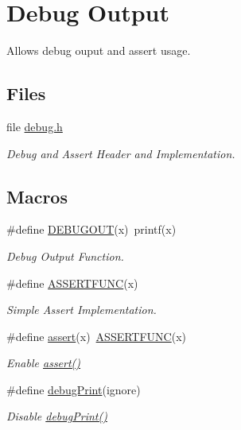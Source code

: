 \hypertarget{group__debug}{\section{Debug Output}
\label{group__debug}
}


Allows debug ouput and assert usage.  


\subsection*{Files}
\begin{DoxyCompactItemize}
\item 
file \hyperlink{debug_8h}{debug.\-h}
\begin{DoxyCompactList}\small\item\em Debug and Assert Header and Implementation. \end{DoxyCompactList}\end{DoxyCompactItemize}
\subsection*{Macros}
\begin{DoxyCompactItemize}
\item 
\#define \hyperlink{group__debug_ga19525f7b34cac5693e8cd76d113de4ea}{D\-E\-B\-U\-G\-O\-U\-T}(x)~printf(x)
\begin{DoxyCompactList}\small\item\em Debug Output Function. \end{DoxyCompactList}\item 
\#define \hyperlink{group__debug_ga9dfd1281735240dcb36d5f605013d40e}{A\-S\-S\-E\-R\-T\-F\-U\-N\-C}(x)
\begin{DoxyCompactList}\small\item\em Simple Assert Implementation. \end{DoxyCompactList}\item 
\#define \hyperlink{group__debug_gaf576bf8ffa22a44e53018c67095ffbf0}{assert}(x)~\hyperlink{group__debug_ga9dfd1281735240dcb36d5f605013d40e}{A\-S\-S\-E\-R\-T\-F\-U\-N\-C}(x)
\begin{DoxyCompactList}\small\item\em Enable \hyperlink{group__debug_gaf576bf8ffa22a44e53018c67095ffbf0}{assert()} \end{DoxyCompactList}\item 
\#define \hyperlink{group__debug_gada1787bea8c10cd89775d6918f6fd324}{debug\-Print}(ignore)
\begin{DoxyCompactList}\small\item\em Disable \hyperlink{group__debug_gada1787bea8c10cd89775d6918f6fd324}{debug\-Print()} \end{DoxyCompactList}\end{DoxyCompactItemize}


